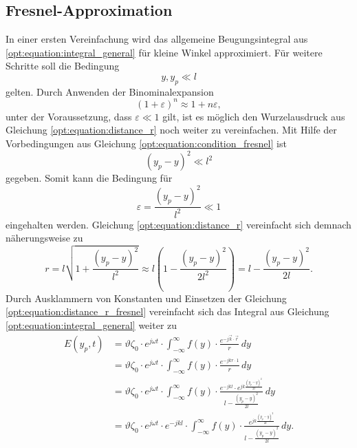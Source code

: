 \subsection{Fresnel-Approximation}
\label{opt:sec:fresnel}
In einer ersten Vereinfachung wird das allgemeine Beugungsintegral aus \eqref{opt:equation:integral_general} für kleine Winkel approximiert.
Für weitere Schritte soll die Bedingung
\begin{equation}
y, y_p
\ll
l
\label{opt:equation:condition_fresnel}
\end{equation}
gelten.
Durch Anwenden der Binominalexpansion
\begin{equation*}
(1 + \varepsilon)^n
\approx
1 + n\varepsilon
,
\end{equation*}
unter der Voraussetzung, dass $\varepsilon \ll 1$ gilt, ist es möglich den Wurzelausdruck aus Gleichung \eqref{opt:equation:distance_r} noch weiter zu vereinfachen.
Mit Hilfe der Vorbedingungen aus Gleichung \eqref{opt:equation:condition_fresnel} ist
\begin{equation*}
(y_p-y)^2
\ll
l^2
\end{equation*}
gegeben.
Somit kann die Bedingung für
\begin{equation*}
\varepsilon
=
\frac{(y_p-y)^2}{l^2}
\ll
1
\end{equation*}
eingehalten werden.
Gleichung \eqref{opt:equation:distance_r} vereinfacht sich demnach näherungsweise zu
\begin{equation}
r
=
l \sqrt{1 + \frac{(y_p-y)^2}{l^2}}
\approx
l \left(1 - \frac{(y_p-y)^2}{2l^2}\right)
=
l - \frac{(y_p-y)^2}{2l}
.
\label{opt:equation:distance_r_fresnel}
\end{equation}
Durch Ausklammern von Konstanten und Einsetzen der Gleichung \eqref{opt:equation:distance_r_fresnel} vereinfacht sich das Integral aus Gleichung \eqref{opt:equation:integral_general} weiter zu
\begin{align*}
E(y_p, t)
&=
\vartheta\zeta_0 \cdot e^{j\omega t} \cdot \int_{-\infty}^{\infty}f(y)\cdot\frac{e^{-j\vec{k}\cdot\vec{r}}}{r} \,dy
\\
&=
\vartheta\zeta_0 \cdot e^{j\omega t} \cdot \int_{-\infty}^{\infty}f(y)\cdot\frac{e^{-jkr \cdot 1}}{r} \,dy
\\
&=
\vartheta\zeta_0 \cdot e^{j\omega t} \cdot \int_{-\infty}^{\infty}f(y)\cdot\frac{e^{-jkl} \cdot e^{jk\frac{(y_p-y)^2}{2l}}}{l - \frac{(y_p-y)^2}{2l}} \,dy
\\
&=
\vartheta\zeta_0 \cdot e^{j\omega t} \cdot e^{-jkl} \cdot \int_{-\infty}^{\infty}f(y)\cdot\frac{e^{jk\frac{(y_p-y)^2}{2l}}}{l - \frac{(y_p-y)^2}{2l}} \,dy
.
\end{align*}
